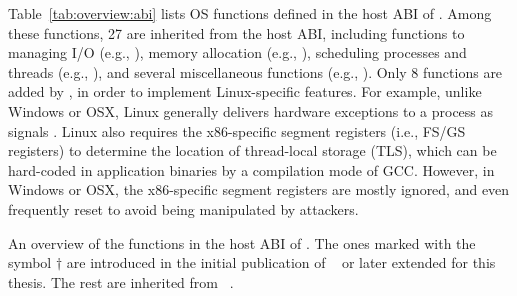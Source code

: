 Table~\ref{tab:overview:abi} lists \palcalls{} OS functions defined in the host ABI of \graphene{}.
Among these functions, 
27 are inherited from the \drawbridge{} host ABI,
including functions to managing I/O (e.g., ), memory allocation (e.g., ), scheduling processes and threads (e.g., ), and several miscellaneous functions (e.g., ).
Only 8 functions are added by \graphene{}, in order to implement Linux-specific features.
For example, unlike Windows or OSX, Linux generally
delivers hardware exceptions to a process as signals .
Linux also requires 
the x86-specific segment registers (i.e., FS/GS registers)
to determine the location of thread-local storage (TLS), which can be hard-coded in application binaries by a compilation mode of GCC.
However, in Windows or OSX, the x86-specific segment registers are mostly ignored, and even frequently reset to avoid being manipulated by attackers.




\begin{table}[htp!]
\centering

\caption{An overview of the \palcalls{} functions in the host ABI of \graphene{}. The ones marked with the symbol $\dagger$ are introduced in the initial publication of \graphene{}~\cite{tsai14graphene} or later extended for this thesis. The rest are inherited from \drawbridge{}~\cite{porter11drawbridge}.}
\label{tab:overview:abi}
\end{table}

